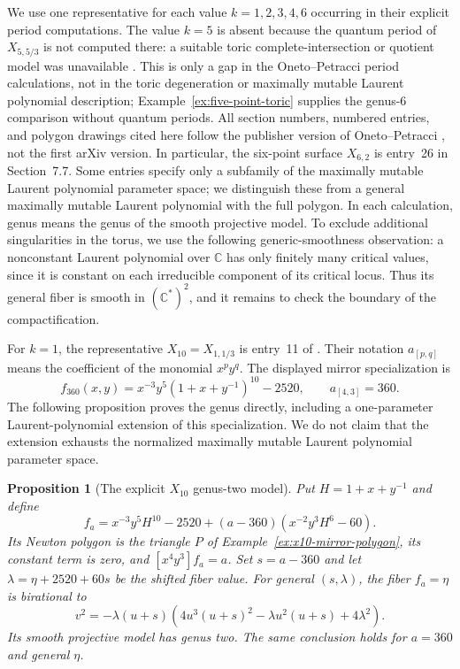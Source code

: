 \documentclass[11pt]{article}
\theoremstyle{plain}
\newtheorem{proposition}[theorem]{Proposition}
\theoremstyle{definition}
\theoremstyle{remark}
\newcommand{\C}{\mathbb C}
\newcommand{\1}{\mathbf 1}
\begin{document}
We use one representative for each value $k=1,2,3,4,6$ occurring in their explicit period computations.  The value $k=5$ is absent because the quantum period of $X_{5,5/3}$ is not computed there: a suitable toric complete-intersection or quotient model was unavailable \cite[Introduction and Theorem 2.2]{OP}.  This is only a gap in the Oneto--Petracci period calculations, not in the toric degeneration or maximally mutable Laurent polynomial description; Example~\ref{ex:five-point-toric} supplies the genus-$6$ comparison without quantum periods.  All section numbers, numbered entries, and polygon drawings cited here follow the publisher version of Oneto--Petracci \cite[Section 7]{OP}, not the first arXiv version.  In particular, the six-point surface $X_{6,2}$ is entry~26 in Section~7.7.  Some entries specify only a subfamily of the maximally mutable Laurent polynomial parameter space; we distinguish these from a general maximally mutable Laurent polynomial with the full polygon.  In each calculation, genus means the genus of the smooth projective model.  To exclude additional singularities in the torus, we use the following generic-smoothness observation: a nonconstant Laurent polynomial over $\C$ has only finitely many critical values, since it is constant on each irreducible component of its critical locus.  Thus its general fiber is smooth in $(\C^*)^2$, and it remains to check the boundary of the compactification.

For $k=1$, the representative $X_{10}=X_{1,1/3}$ is entry~11 of \cite[Section 7.3, polygon 1]{OP}.  Their notation $a_{[p,q]}$ means the coefficient of the monomial $x^py^q$.  The displayed mirror specialization is
\[
f_{360}(x,y)=x^{-3}y^5(1+x+y^{-1})^{10}-2520,
\qquad a_{[4,3]}=360.
\]
The following proposition proves the genus directly, including a one-parameter Laurent-polynomial extension of this specialization.  We do not claim that the extension exhausts the normalized maximally mutable Laurent polynomial parameter space.

\begin{proposition}[The explicit $X_{10}$ genus-two model]\label{prop:x10-explicit-model}
Put $H=1+x+y^{-1}$ and define
\begin{equation}\label{eq:x10-factorized-family}
f_a=x^{-3}y^5H^{10}-2520+(a-360)(x^{-2}y^3H^6-60).
\end{equation}
Its Newton polygon is the triangle $P$ of Example~\ref{ex:x10-mirror-polygon}, its constant term is zero, and $[x^4y^3]f_a=a$.  Set $s=a-360$ and let $\lambda=\eta+2520+60s$ be the shifted fiber value.  For general $(s,\lambda)$, the fiber $f_a=\eta$ is birational to
\begin{equation}\label{eq:x10-hyperelliptic}
v^2=-\lambda(u+s)\left(4u^3(u+s)^2-\lambda u^2(u+s)+4\lambda^2\right).
\end{equation}
Its smooth projective model has genus two.  The same conclusion holds for $a=360$ and general $\eta$.
\end{proposition}
\end{document}

